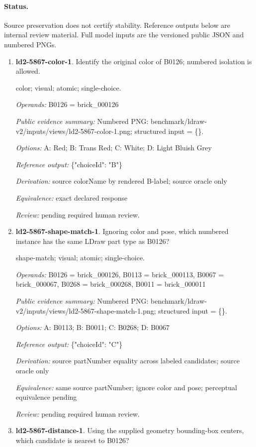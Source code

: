 \paragraph{Status.}Source preservation does not certify stability. Reference outputs below are internal review material. Full model inputs are the versioned public JSON and numbered PNGs.
\begin{enumerate}
\item \textbf{ld2-5867-color-1}. Identify the original color of B0126; numbered isolation is allowed.
\par{\small color; visual; atomic; single-choice.\par\textit{Operands:} B0126 = brick\_000126\par\textit{Public evidence summary:} Numbered PNG: benchmark/ldraw-v2/inputs/views/ld2-5867-color-1.png; structured input = \{\}.\par\textit{Options:} A: Red; B: Trans Red; C: White; D: Light Bluish Grey\par\textit{Reference output:} \{"choiceId": "B"\}\par\textit{Derivation:} source colorName by rendered B-label; source oracle only\par\textit{Equivalence:} exact declared response\par\textit{Review:} pending required human review.}
\item \textbf{ld2-5867-shape-match-1}. Ignoring color and pose, which numbered instance has the same LDraw part type as B0126?
\par{\small shape-match; visual; atomic; single-choice.\par\textit{Operands:} B0126 = brick\_000126, B0113 = brick\_000113, B0067 = brick\_000067, B0268 = brick\_000268, B0011 = brick\_000011\par\textit{Public evidence summary:} Numbered PNG: benchmark/ldraw-v2/inputs/views/ld2-5867-shape-match-1.png; structured input = \{\}.\par\textit{Options:} A: B0113; B: B0011; C: B0268; D: B0067\par\textit{Reference output:} \{"choiceId": "C"\}\par\textit{Derivation:} source partNumber equality across labeled candidates; source oracle only\par\textit{Equivalence:} same source partNumber; ignore color and pose; perceptual equivalence pending\par\textit{Review:} pending required human review.}
\item \textbf{ld2-5867-distance-1}. Using the supplied geometry bounding-box centers, which candidate is nearest to B0126?

\end{enumerate}
